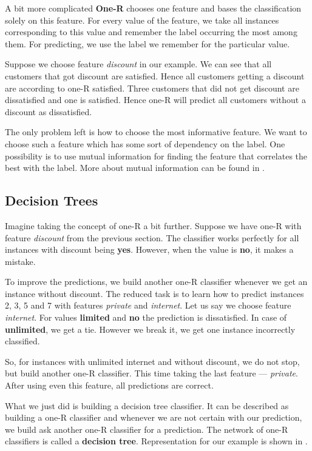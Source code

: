 A bit more complicated {\bf One-R} chooses one feature and bases the classification solely on this feature.
For every value of the feature, we take all instances corresponding to this value and remember the label occurring the most among them.
For predicting, we use the label we remember for the particular value.

Suppose we choose feature \textit{discount} in our example.
We can see that all customers that got discount are satisfied.
Hence all customers getting a discount are according to one-R satisfied.
Three customers that did not get discount are dissatisfied and one is satisfied.
Hence one-R will predict all customers without a discount as dissatisfied.

The only problem left is how to choose the most informative feature.
We want to choose such a feature which has some sort of dependency on the label.
One possibility is to use mutual information for finding the feature
that correlates the best with the label.
More about mutual information can be found in .


\subsection{Decision Trees}\label{subsec:decisiontree}

Imagine taking the concept of one-R a bit further.
Suppose we have one-R with feature \textit{discount} from the previous section.
The classifier works perfectly for all instances with discount being \textbf{yes}.
However, when the value is \textbf{no}, it makes a mistake.

To improve the predictions, we build another one-R classifier
whenever we get an instance without discount.
The reduced task is to learn how to predict instances 2, 3, 5 and 7 with features \textit{private} and \textit{internet}.
Let us say we choose feature \textit{internet}.
For values \textbf{limited} and \textbf{no} the prediction is dissatisfied.
In case of \textbf{unlimited}, we get a tie.
However we break it, we get one instance incorrectly classified.

So, for instances with unlimited internet and without discount, we do not stop, but
build another one-R classifier.
This time taking the last feature --- \textit{private}.
After using even this feature, all predictions are correct.

What we just did is building a decision tree classifier.
It can be described as
building a one-R classifier and whenever we are not certain with our prediction,
we build ask another one-R classifier for a prediction.
The network of one-R classifiers is called a \textbf{decision tree}.
Representation for our example is shown in .


